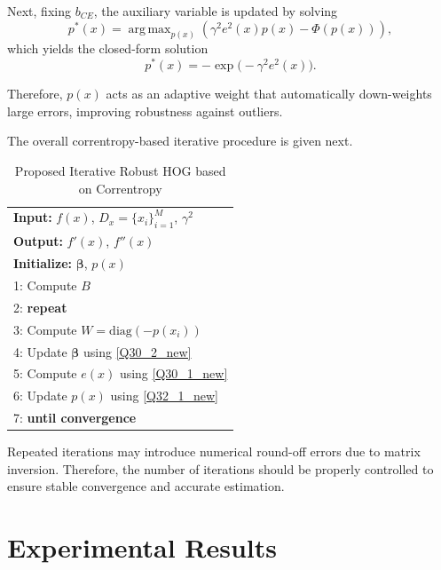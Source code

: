 \documentclass{elsarticle}
\DeclareMathOperator*{\argmax}{arg\,max}
\begin{document}
Next, fixing $b_{CE}$, the auxiliary variable is updated by solving
\begin{equation}\label{Q31_1_new}
	p^*(x) =
	\argmax_{p(x)}
	\left(
	\gamma^2 e^2(x)p(x) - \Phi(p(x))
	\right),
\end{equation}
which yields the closed-form solution
\begin{equation}\label{Q32_1_new}
	p^*(x) = -\exp\big(-\gamma^2 e^2(x)\big).
\end{equation}

Therefore, $p(x)$ acts as an adaptive weight that automatically down-weights large errors, improving robustness against outliers.

The overall correntropy-based iterative procedure is given next.

\begin{table}[t]
	\centering
	\normalsize
	\caption{Proposed Iterative Robust HOG based on Correntropy}
	\label{tab:robust_hog}
	\begin{tabular}{l}
		\hline
		\textbf{Input:} $f(x)$, $D_x = \{x_i\}_{i=1}^M$, $\gamma^2$ \\ 
		\textbf{Output:} $f'(x)$, $f''(x)$ \\
		
		\textbf{Initialize:} $\boldsymbol{\beta}$, $p(x)$ \\
		
		1: Compute $B$ \\
		2: \textbf{repeat} \\
		3: \quad Compute $W = \mathrm{diag}(-p(x_i))$ \\
		4: \quad Update $\boldsymbol{\beta}$ using \eqref{Q30_2_new} \\
		5: \quad Compute $e(x)$ using \eqref{Q30_1_new} \\
		6: \quad Update $p(x)$ using \eqref{Q32_1_new} \\
		7: \textbf{until convergence} \\
		\hline
	\end{tabular}
\end{table}

Repeated iterations may introduce numerical round-off errors due to matrix inversion. Therefore, the number of iterations should be properly controlled to ensure stable convergence and accurate estimation.



\section{Experimental Results}
\end{document}
